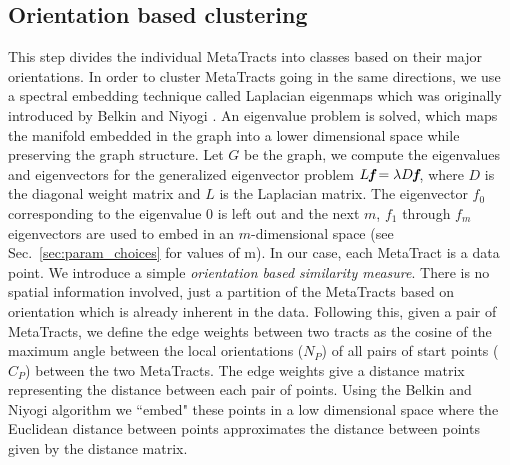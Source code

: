 \subsection {Orientation based clustering}
This step divides the individual MetaTracts into classes based on their major orientations. In order to cluster MetaTracts going in the same directions, we use a spectral embedding technique called Laplacian eigenmaps which was originally introduced by Belkin and Niyogi \cite{Belkin01}. An eigenvalue problem is solved, which maps the manifold embedded in the graph into a lower dimensional space while preserving the graph structure.
Let $G$ be the graph, we compute the eigenvalues and eigenvectors for the generalized eigenvector problem $L\textit{\textbf{f}}=\lambda D\textit{\textbf{f}}$,
where $D$ is the diagonal weight matrix and $L$ is the Laplacian matrix. The eigenvector \textbf{${f}_{0}$} corresponding to the eigenvalue 0 is left out and the next $m$, {\textbf{${f}_{1}$} through \textbf{${f}_{m}$}} eigenvectors are used to embed in an $m$-dimensional space (see Sec.~\ref{sec:param_choices} for values of m).
 In our case, each MetaTract is a data point. We introduce a simple \textit{orientation based similarity measure}. There is no spatial information involved, just a partition of the MetaTracts based on orientation which is already inherent in the data.
Following this, given a pair of  MetaTracts, we define the edge weights between two tracts as the cosine of the maximum angle between the local orientations ($N_P$) of all pairs of start points ($C_P$) between the two MetaTracts. The edge weights give a distance matrix representing the distance between each pair of points. Using the Belkin and Niyogi algorithm we ``embed" these points in a low dimensional space where the Euclidean distance between points approximates the distance between points given by the distance matrix. 
%
